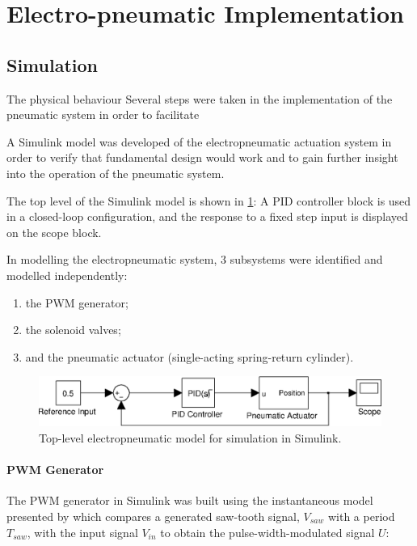 \section{Electro-pneumatic Implementation\label{sec:electropneumatic_implementation}}

\subsection{Simulation}

The physical behaviour 
Several steps were taken in the implementation of the pneumatic system in order to facilitate

A Simulink model was developed of the electropneumatic actuation system in order to verify that fundamental design would work and to gain further insight into the operation of the pneumatic system.

The top level of the Simulink model is shown in \ref{fig:pneumatics_top_level}: A PID controller block is used in a closed-loop configuration, and the response to a fixed step input is displayed on the scope block.

In modelling the electropneumatic system, 3 subsystems were identified and modelled independently:

\begin{enumerate}
  \item the PWM generator;
  \item the solenoid valves;
  \item and the pneumatic actuator (single-acting spring-return cylinder).
\end{enumerate}

\begin{figure}[h]
\centering
\includegraphics[scale=1]{implementation/figures/pneumatic_modelling1.eps}
\caption{Top-level electropneumatic model for simulation in Simulink.}
\label{fig:pneumatics_top_level}
\end{figure}

\paragraph{PWM Generator}

The PWM generator in Simulink was built using the instantaneous model presented by \citet{valve_models} which compares a generated saw-tooth signal, $V_{saw}$ with a period $T_{saw}$, with the input signal $V_{in}$ to obtain the pulse-width-modulated signal $U$:


